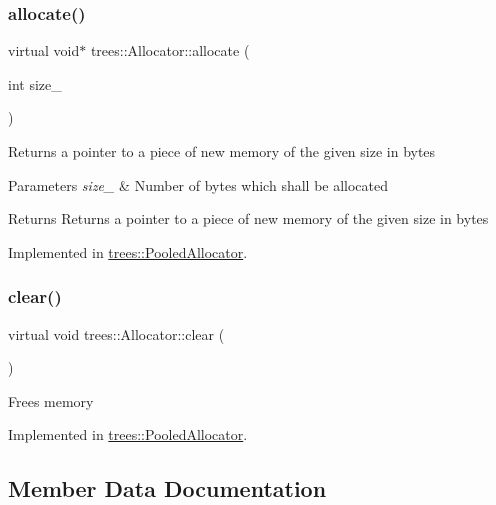 \subsubsection{\texorpdfstring{allocate()}{allocate()}}
{\footnotesize\ttfamily virtual void$\ast$ trees\+::\+Allocator\+::allocate (\begin{DoxyParamCaption}\item[{int}]{size\+\_\+ }\end{DoxyParamCaption})\hspace{0.3cm}{\ttfamily [pure virtual]}}

Returns a pointer to a piece of new memory of the given size in bytes


\begin{DoxyParams}{Parameters}
{\em size\+\_\+} & Number of bytes which shall be allocated \\
\hline
\end{DoxyParams}
\begin{DoxyReturn}{Returns}
Returns a pointer to a piece of new memory of the given size in bytes 
\end{DoxyReturn}


Implemented in \hyperlink{classtrees_1_1_pooled_allocator_a96e389f45a528f153f7518dbe807c1d6}{trees\+::\+Pooled\+Allocator}.

\mbox{\label{classtrees_1_1_allocator_aa1188b27061817113bc4a3e4523868e0}} 
\subsubsection{\texorpdfstring{clear()}{clear()}}
{\footnotesize\ttfamily virtual void trees\+::\+Allocator\+::clear (\begin{DoxyParamCaption}{ }\end{DoxyParamCaption})\hspace{0.3cm}{\ttfamily [pure virtual]}}

Frees memory 

Implemented in \hyperlink{classtrees_1_1_pooled_allocator_aeaf5da95ab275fed2865de00801e79b2}{trees\+::\+Pooled\+Allocator}.



\subsection{Member Data Documentation}
\mbox{\label{classtrees_1_1_allocator_a9cd94b47f93ea913811291ce8a3071a1}} 

